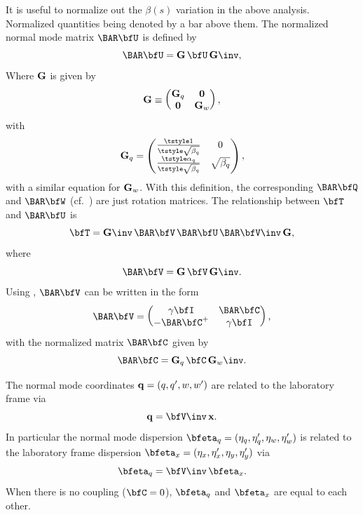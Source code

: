 It is useful to normalize out the $\beta(s)$ variation in the above analysis. Normalized quantities
being denoted by a bar above them. The normalized normal mode matrix $\BAR\bfU$ is defined by
  \begin{equation}
    \BAR\bfU = \bfG \, \bfU \, \bfG\inv
    , \label{ugug}
  \end{equation}
Where ${\bf G}$ is given by 
  \begin{equation}
    {\bf G} \equiv 
    \begin{pmatrix}
      {\bf G}_q & {\bf 0} \cr 
      {\bf 0} & {\bf G}_w
    \end{pmatrix}
    , \label{gg00g}
  \end{equation}  
with 
  \begin{equation}
    \bfG_q = 
    \begin{pmatrix}
      \frac{\tstyle 1}{\tstyle \sqrt{\beta_q}} & 0 \cr
      \frac{\tstyle \alpha_q}{\tstyle \sqrt{\beta_q}} & \sqrt{\beta_q}
    \end{pmatrix}
    , \label{g1b0a} 
  \end{equation}
with a similar equation for ${\bf G}_w$. With this definition, the corresponding $\BAR\bfQ$ and
$\BAR\bfW$ (cf.~) are just rotation matrices. The relationship between $\bfT$ and
$\BAR\bfU$ is
  \begin{equation}
    \bfT = \bfG\inv \, \BAR\bfV \, \BAR\bfU \, \BAR\bfV\inv \, \bfG
    , \label{tgvuv}
  \end{equation}
where
  \begin{equation}
    \BAR\bfV = \bfG \, \bfV \, \bfG\inv
    . \label{vgvg}
  \end{equation}
Using , $\BAR\bfV$ can be written in the form
  \begin{equation}
    \BAR\bfV = 
    \begin{pmatrix}
      \gamma \bfI & \BAR\bfC \cr -\BAR\bfC^+ & \gamma \bfI
    \end{pmatrix}
    , \label{vgicc3}
  \end{equation}
with the normalized matrix $\BAR\bfC$ given by
  \begin{equation}
    \BAR\bfC = \bfG_q \, \bfC \, \bfG_w\inv
    . \label{cgcg}
  \end{equation}

The normal mode coordinates ${\bf q} = (q, q', w, w')$ are related to the laboratory frame via
  \begin{equation}
    {\bf q} = \bfV\inv \, {\bf x}
    . \label{avx}
  \end{equation} 
In particular the normal mode dispersion $\bfeta_q = (\eta_q, \eta'_q, \eta_w, \eta'_w)$ is related
to the laboratory frame dispersion $\bfeta_x = (\eta_x, \eta'_x, \eta_y, \eta'_y)$ via
  \begin{equation}
    {\bfeta_q} = \bfV\inv \, {\bfeta_x}
    . \label{etaavx}
  \end{equation} 
When there is no coupling ($\bfC = 0$), $\bfeta_q$ and $\bfeta_x$ are
equal to each other.


